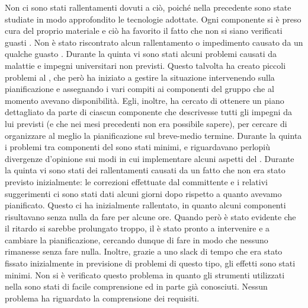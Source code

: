 		Non ci sono stati rallentamenti dovuti a ciò, poiché nella precedente  sono state studiate in modo approfondito le tecnologie adottate.
		Ogni componente si è preso cura del proprio materiale e ciò ha favorito il fatto che non si siano verificati guasti . Non è stato riscontrato alcun rallentamento o impedimento causato da un qualche guasto .
		Durante la quinta  vi sono stati alcuni problemi causati da malattie e impegni universitari non previsti. Questo talvolta ha creato piccoli problemi al , che però ha iniziato a gestire la situazione intervenendo sulla pianificazione e assegnando i vari compiti ai componenti del gruppo che al momento avevano disponibilità. Egli, inoltre, ha cercato di ottenere un piano dettagliato da parte di ciascun componente che descrivesse tutti gli impegni da lui previsti (e che nei mesi precedenti non era possibile sapere), per cercare di organizzare al meglio la pianificazione sul breve-medio termine.
		Durante la quinta  i problemi tra componenti del  sono stati minimi, e riguardavano perlopiù divergenze d'opinione sui modi in cui implementare alcuni aspetti del .
		Durante la quinta  vi sono stati dei rallentamenti causati da un fatto che non era stato previsto inizialmente: le correzioni effettuate dal committente e i relativi suggerimenti ci sono stati dati alcuni giorni dopo rispetto a quanto avevamo pianificato. Questo ci ha inizialmente rallentato, in quanto alcuni componenti risultavano senza nulla da fare per alcune ore. Quando però è stato evidente che il ritardo si sarebbe prolungato troppo, il  è stato pronto a intervenire e a cambiare la pianificazione, cercando dunque di fare in modo che nessuno rimanesse senza fare nulla. Inoltre, grazie a uno slack di tempo che era stato fissato inizialmente in previsione di problemi di questo tipo, gli effetti sono stati minimi.
		Non si è verificato questo problema in quanto gli strumenti utilizzati nella  sono stati di facile comprensione ed in parte già conosciuti.
		Nessun problema ha riguardato la comprensione dei requisiti.

